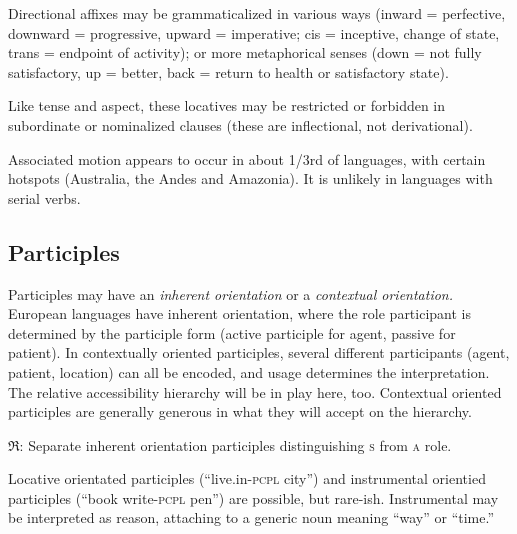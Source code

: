 \documentclass[11pt]{article}
\newcommand{\I}[1]{\textsc{#1}}   %
\newcommand{\rara}[1]{$\mathfrak{R}$: #1}
\begin{document}
Directional affixes may be grammaticalized in various ways (inward =
perfective, downward = progressive, upward = imperative; cis =
inceptive, change of state, trans = endpoint of activity); or more
metaphorical senses (down = not fully satisfactory, up = better, back
= return to health or satisfactory state).

Like tense and aspect, these locatives may be restricted or forbidden
in subordinate or nominalized clauses (these are inflectional, not
derivational). 

Associated motion appears to occur in about 1/3rd of languages, with
certain hotspots (Australia, the Andes and Amazonia).  It is unlikely
in languages with serial verbs.


\subsection{Participles}
Participles may have an \textit{inherent orientation} or a
\textit{contextual orientation.}  European languages have inherent
orientation, where the role participant is determined by the
participle form (active participle for agent, passive for patient).
In contextually oriented participles, several different participants
(agent, patient, location) can all be encoded, and usage determines
the interpretation.  The relative accessibility hierarchy will be in
play here, too.  Contextual oriented participles are generally
generous in what they will accept on the hierarchy.

\rara{Separate inherent orientation participles distinguishing \I{s}
from \I{a} role.}

Locative orientated participles (``live.in-\I{pcpl} city'') and
instrumental orientied participles (``book write-\I{pcpl} pen'') are
possible, but rare-ish.  Instrumental may be interpreted as reason,
attaching to a generic noun meaning ``way'' or ``time.''
\end{document}

